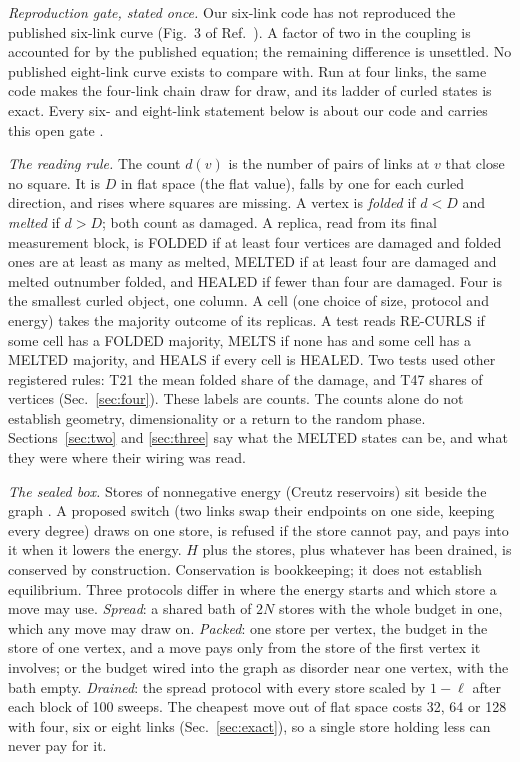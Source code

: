 \documentclass[aps,pre,10pt,twocolumn,superscriptaddress,nofootinbib]{revtex4-2}
\begin{document}
\emph{Reproduction gate, stated once.} Our six-link code has not reproduced the published six-link curve (Fig.~3
of Ref.~\cite{T22}). A factor of two in the coupling is accounted for by the published equation; the remaining
difference is unsettled. No published eight-link curve exists to compare with. Run at four links, the same code
makes the four-link chain draw for draw, and its ladder of curled states is exact. Every six- and eight-link
statement below is about our code and carries this open gate \cite{repo}.

\emph{The reading rule.} The count $d(v)$ is the number of pairs of links at $v$ that close no square. It is $D$ in
flat space (the flat value), falls by one for each curled direction, and rises where squares are missing. A
vertex is \emph{folded} if $d < D$ and \emph{melted} if $d > D$; both count as damaged. A replica, read from its
final measurement block, is FOLDED if at least four vertices are damaged and folded ones are at least as many as
melted, MELTED if at least four are damaged and melted outnumber folded, and HEALED if fewer than four are damaged.
Four is the smallest curled object, one column. A cell (one choice of size, protocol and energy) takes the majority
outcome of its replicas. A test reads RE-CURLS if
some cell has a FOLDED majority, MELTS if none has and some cell has a MELTED majority, and HEALS if every cell is
HEALED. Two tests used other registered rules: T21 the mean folded share of the damage, and T47 shares of vertices
(Sec.~\ref{sec:four}). These labels are counts. The counts alone do not establish geometry, dimensionality
or a return to the random phase. Sections~\ref{sec:two} and \ref{sec:three} say what the MELTED states can be, and
what they were where their wiring was read.

\emph{The sealed box.} Stores of nonnegative energy (Creutz reservoirs) sit beside the graph \cite{Creutz83}. A
proposed switch (two links swap their endpoints on one side, keeping every degree) draws on one store, is refused
if the store cannot pay, and pays into it when it lowers the energy. $H$ plus the stores, plus whatever has been
drained, is conserved by construction. Conservation is bookkeeping; it does not establish
equilibrium. Three protocols differ in where the energy starts and which store a move may use. \emph{Spread}: a
shared bath of $2N$ stores with the whole budget in one, which any move may draw on. \emph{Packed}: one store per
vertex, the budget in the store of one vertex, and a move pays only from the store of the first vertex it involves;
or the budget wired into the graph as disorder near one vertex, with the bath empty. \emph{Drained}: the spread
protocol with every store scaled by $1 - \ell$ after each block of 100 sweeps. The cheapest move out of flat space
costs 32, 64 or 128 with four, six or eight links (Sec.~\ref{sec:exact}), so a single store holding less can never
pay for it.
\end{document}
